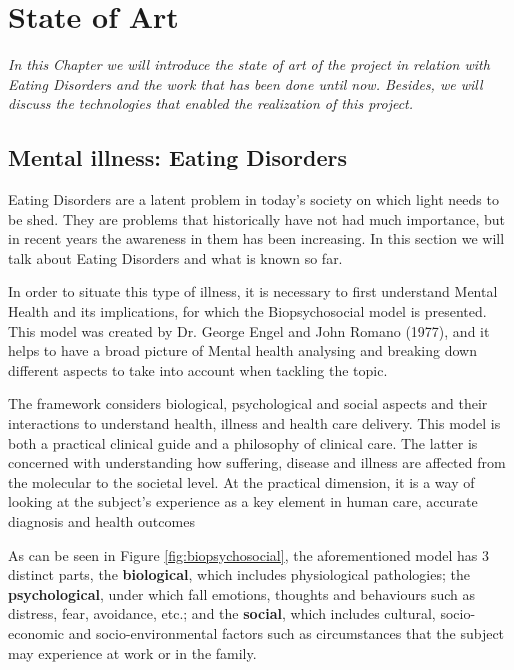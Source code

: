 \chapter{State of Art}
\label{chap:state-of-art}
\textit{In this Chapter we will introduce the state of art of the project in relation with Eating Disorders and the work that has been done until now. Besides, we will discuss the technologies that enabled the realization of this project.}

\clearpage
\section{Mental illness: Eating Disorders}
Eating Disorders are a latent problem in today's society on which light needs to be shed. They are problems that historically have not had much importance, but in recent years the awareness in them has been increasing. In this section we will talk about Eating Disorders and what is known so far.

In order to situate this type of illness, it is necessary to first understand Mental Health and its implications, for which the Biopsychosocial model is presented. This model was created by Dr. George Engel and John Romano (1977), and it helps to have a broad picture of Mental health analysing and breaking down different aspects to take into account when tackling the topic. 


The framework considers biological, psychological and social aspects and their interactions to understand health, illness and health care delivery. This model is both a practical clinical guide and a philosophy of clinical care. The latter is concerned with understanding how suffering, disease and illness are affected from the molecular to the societal level. At the practical dimension, it is a way of looking at the subject's experience as a key element in human care, accurate diagnosis and health outcomes

As can be seen in Figure \ref{fig:biopsychosocial}, the aforementioned model has 3 distinct parts, the \textbf{biological}, which includes physiological pathologies; the \textbf{psychological}, under which fall emotions, thoughts and behaviours such as distress, fear, avoidance, etc.; and the \textbf{social}, which includes cultural, socio-economic and socio-environmental factors such as circumstances that the subject may experience at work or in the family.

